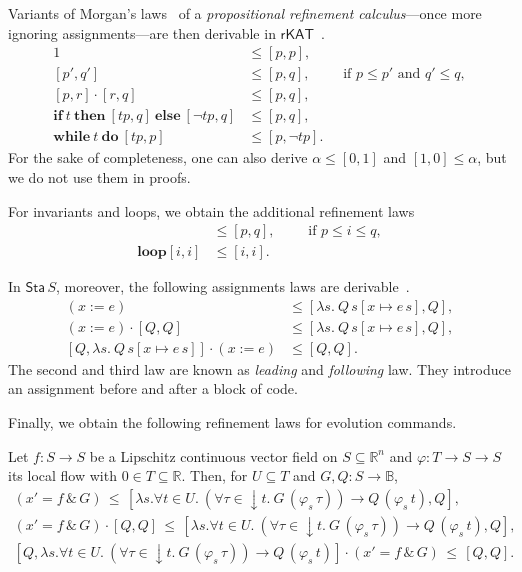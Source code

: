 \documentclass[envcountsame,envcountsect]{llncs}
\newcommand{\IF}[3]{\mathbf{if}\ #1\ \mathbf{then}\ #2\ \mathbf{else}\ #3}
\newcommand{\WHILE}[2]{\mathbf{while}\ #1\ \mathbf{do}\ #2}
\newcommand{\rKAT}{\mathsf{rKAT}}
\newcommand{\flow}{\varphi}
\newcommand{\reals}{\mathbb{R}}
\newcommand{\bools}{\mathbb{B}}
\newcommand{\sta}{\mathsf{Sta}}
\begin{document}
Variants of Morgan's laws~\cite{Morgan94} of a \emph{propositional
  refinement calculus}---once more ignoring assignments---are then derivable in
$\rKAT$~\cite{ArmstrongGS16}.
\begin{align}
  1 &\le [p,p],\label{eq:r-skip}\tag{r-skip}\\
[p',q'] &\le [p,q],\qquad \text{ if } p\le p'\text{ and } q'\le q,\label{eq:r-cons}\tag{r-cons}\\
[p,r]\cdot [r,q] &\le [p,q],\label{eq:r-seq}\tag{r-seq}\\
\IF{t}{[tp,q]}{[\neg tp,q]} &\le [p,q],\label{eq:r-cond}\tag{r-cond}\\
 \WHILE{t}{[tp,p]} &\le [p,\neg tp]. \label{eq:r-while}\tag{r-while}
\end{align}
For the sake of completeness, one can also derive $\alpha \le [0,1]$ and $[1,0] \le \alpha$, but we do not use them in proofs.

For invariants and loops, we obtain the additional refinement laws
\begin{align}
  [i,i] &\le [p,q],\qquad \text{ if } p\le i \le q,\label{eq:r-inv}\tag{r-inv}\\
\mathbf{loop} [i,i] &\le [i,i]. \label{eq:r-loop}\tag{r-loop}
\end{align}

In $\sta\, S$, moreover, the following assignments laws are
derivable~\cite{ArmstrongGS16}.
\begin{align}
 (x := e)  &\le  \left[\lambda s.\ Q\, s[x\mapsto e\, s],Q\right],\label{eq:r-assgn}\tag{r-assgn}\\
(x:= e) \cdot \left[Q,Q\right] &\le [\lambda s.\ Q\, s[x\mapsto e\, s],Q],\label{eq:r-assgn}\tag{r-assgnl}\\
\left[Q,\lambda s.\ Q\, s[x\mapsto e\, s]\right]\cdot (x:=e) &\le [Q,Q]. \label{eq:r-assgn}\tag{r-assgnf}
\end{align}
The second and third law are known as \emph{leading} and \emph{following}
law. They introduce an assignment before and after a block of code. 

Finally, we obtain the following refinement laws for evolution
commands.
\begin{lemma}\label{P:r-evl-lemma}
  Let $f:S\to S$ be a Lipschitz continuous vector field on
  $S\subseteq \reals^n$ and $\flow:T\to S\to S$ its local flow with
  $0\in T\subseteq \reals$. Then, for $U\subseteq T$ and
  $G,Q:S\to\bools$,
\begin{gather*}
(x' = f\, \&\, G)\, \le\, [\lambda s.\forall t\in U.\ (\forall
\tau\in {\downarrow}t.\ G\, (\flow_s\, \tau))\to Q\, (\flow_s\, t),Q],\label{eq:r-evl}\tag{r-evl}\\
(x' = f\, \&\, G) \cdot \left[Q,Q\right]\, \le\, [\lambda s. \forall t\in U.\ (\forall
\tau\in {\downarrow}t.\ G\, (\flow_s\, \tau))\to Q\, (\flow_s\, t),Q],\label{eq:r-evll}\tag{r-evll}\\
\left[Q,\lambda s. \forall t\in U.\ (\forall
\tau\in {\downarrow}t.\ G\, (\flow_s\, \tau))\to Q\, (\flow_s\,
t)\right]\cdot (x' = f\, \&\, G) \, \le \, [Q,Q].\label{eq:r-evlr}\tag{r-evlr}
\end{gather*}
\end{lemma}
\end{document}
